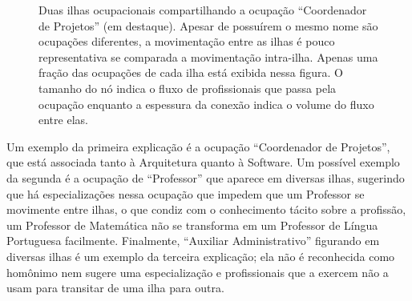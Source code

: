 \documentclass[12pt,a4paper]{article}
\begin{document}
\begin{figure}[htb]
    \centering
    \caption{Duas ilhas ocupacionais compartilhando a ocupação \enquote{Coordenador de Projetos} (em destaque). Apesar de possuírem o mesmo nome são ocupações diferentes, a movimentação entre as ilhas é pouco representativa se comparada a movimentação intra-ilha. Apenas uma fração das ocupações de cada ilha está exibida nessa figura. O tamanho do nó indica o fluxo de profissionais que passa pela ocupação enquanto a espessura da conexão indica o volume do fluxo entre elas.}
    \label{fig:homonimos}
\end{figure}

Um exemplo da primeira explicação é a ocupação \enquote{Coordenador de Projetos}, que está associada tanto à Arquitetura quanto à Software. Um possível exemplo da segunda é a ocupação de \enquote{Professor} que aparece em diversas ilhas, sugerindo que há especializações nessa ocupação que impedem que um Professor se movimente entre ilhas, o que condiz com o conhecimento tácito sobre a profissão, um Professor de Matemática não se transforma em um Professor de Língua Portuguesa facilmente. Finalmente, \enquote{Auxiliar Administrativo} figurando em diversas ilhas é um exemplo da terceira explicação; ela não é reconhecida como homônimo nem sugere uma especialização e profissionais que a exercem não a usam para transitar de uma ilha para outra.
\end{document}
